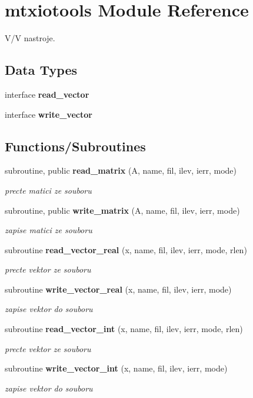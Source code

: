 \section{mtxiotools Module Reference}
\label{namespacemtxiotools}


V/V nastroje.  


\subsection*{Data Types}
\begin{DoxyCompactItemize}
\item 
interface {\bf read\+\_\+vector}
\item 
interface {\bf write\+\_\+vector}
\end{DoxyCompactItemize}
\subsection*{Functions/\+Subroutines}
\begin{DoxyCompactItemize}
\item 
subroutine, public {\bf read\+\_\+matrix} (A, name, fil, ilev, ierr, mode)
\begin{DoxyCompactList}\small\item\em precte matici ze souboru \end{DoxyCompactList}\item 
subroutine, public {\bf write\+\_\+matrix} (A, name, fil, ilev, ierr, mode)
\begin{DoxyCompactList}\small\item\em zapise matici ze souboru \end{DoxyCompactList}\item 
subroutine {\bf read\+\_\+vector\+\_\+real} (x, name, fil, ilev, ierr, mode, rlen)
\begin{DoxyCompactList}\small\item\em precte vektor ze souboru \end{DoxyCompactList}\item 
subroutine {\bf write\+\_\+vector\+\_\+real} (x, name, fil, ilev, ierr, mode)
\begin{DoxyCompactList}\small\item\em zapise vektor do souboru \end{DoxyCompactList}\item 
subroutine {\bf read\+\_\+vector\+\_\+int} (x, name, fil, ilev, ierr, mode, rlen)
\begin{DoxyCompactList}\small\item\em precte vektor ze souboru \end{DoxyCompactList}\item 
subroutine {\bf write\+\_\+vector\+\_\+int} (x, name, fil, ilev, ierr, mode)
\begin{DoxyCompactList}\small\item\em zapise vektor do souboru \end{DoxyCompactList}\end{DoxyCompactItemize}


